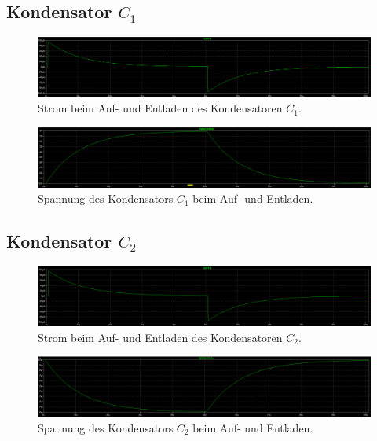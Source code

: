 \documentclass[10pt,a4paper]{article}
\begin{document}
\subsection{Kondensator $C_1$}
\begin{flushleft}
\begin{figure}[H]
\centering
\includegraphics[scale=0.3]{I_C_1}
\caption{Strom beim Auf- und Entladen des Kondensatoren $C_1$.}
\end{figure}

\newpage

\begin{figure}[H]
\centering
\includegraphics[scale=0.3]{V_C_1}
\caption{Spannung des Kondensators $C_1$ beim Auf- und Entladen.}
\end{figure}
\end{flushleft}

\subsection{Kondensator $C_2$}
\begin{flushleft}
\begin{figure}[H]
\centering
\includegraphics[scale=0.3]{I_C_2}
\caption{Strom beim Auf- und Entladen des Kondensatoren $C_2$.}
\end{figure}

\begin{figure}[H]
\centering
\includegraphics[scale=0.3]{V_C_2}
\caption{Spannung des Kondensators $C_2$ beim Auf- und Entladen.}
\end{figure}
\end{flushleft}
\end{document}
